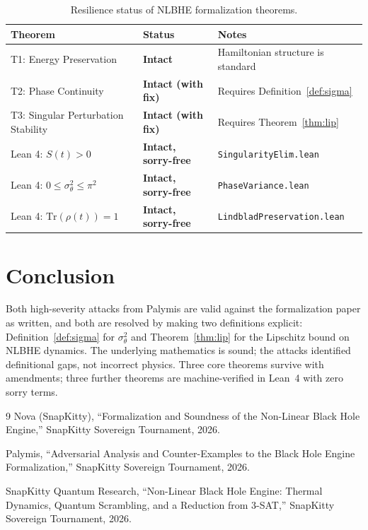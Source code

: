 \documentclass[11pt,letterpaper]{article}
\begin{document}
\begin{table}[ht]
\centering
\caption{Resilience status of NLBHE formalization theorems.}
\begin{tabular}{lll}
\toprule
\textbf{Theorem} & \textbf{Status} & \textbf{Notes} \\
\midrule
T1: Energy Preservation & \textbf{Intact} & Hamiltonian structure is standard \\
T2: Phase Continuity & \textbf{Intact (with fix)} & Requires Definition~\ref{def:sigma} \\
T3: Singular Perturbation Stability & \textbf{Intact (with fix)} & Requires Theorem~\ref{thm:lip} \\
Lean 4: $S(t) > 0$ & \textbf{Intact, sorry-free} & \texttt{SingularityElim.lean} \\
Lean 4: $0 \leq \sigma^2_\theta \leq \pi^2$ & \textbf{Intact, sorry-free} & \texttt{PhaseVariance.lean} \\
Lean 4: $\mathrm{Tr}(\rho(t)) = 1$ & \textbf{Intact, sorry-free} & \texttt{LindbladPreservation.lean} \\
\bottomrule
\end{tabular}
\end{table}

\section{Conclusion}

Both high-severity attacks from Palymis are valid against the formalization paper as
written, and both are resolved by making two definitions explicit:
Definition~\ref{def:sigma} for $\sigma^2_\theta$ and Theorem~\ref{thm:lip} for the
Lipschitz bound on NLBHE dynamics. The underlying mathematics is sound; the attacks
identified definitional gaps, not incorrect physics. Three core theorems survive with
amendments; three further theorems are machine-verified in Lean~4 with zero sorry terms.

\begin{thebibliography}{9}
Nova (SnapKitty),
``Formalization and Soundness of the Non-Linear Black Hole Engine,''
SnapKitty Sovereign Tournament, 2026.

Palymis,
``Adversarial Analysis and Counter-Examples to the Black Hole Engine Formalization,''
SnapKitty Sovereign Tournament, 2026.

SnapKitty Quantum Research,
``Non-Linear Black Hole Engine: Thermal Dynamics, Quantum Scrambling, and a Reduction from 3-SAT,''
SnapKitty Sovereign Tournament, 2026.
\end{thebibliography}
\end{document}
